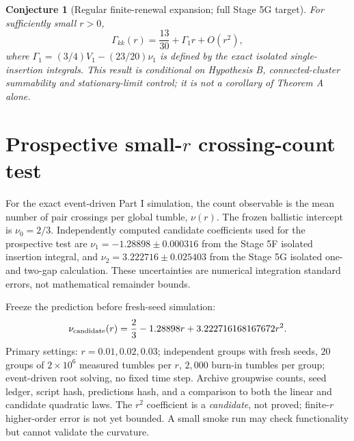 \documentclass[11pt]{article}
\newtheorem{conjecture}[theorem]{Conjecture}
\theoremstyle{remark}\newtheorem{remark}[theorem]{Remark}
\begin{document}
\begin{conjecture}[Regular finite-renewal expansion; full Stage 5G target]
For sufficiently small $r>0$,
\[\Gamma_{kk}(r)=\frac{13}{30}+\Gamma_1r+O(r^2),\]
where $\Gamma_1=(3/4)V_1-(23/20)\nu_1$ is defined by the exact isolated single-insertion integrals. This result is \emph{conditional on} Hypothesis B, connected-cluster summability and stationary-limit control; it is not a corollary of Theorem A alone.
\end{conjecture}

\section{Prospective small-$r$ crossing-count test}
For the exact event-driven Part I simulation, the count observable is the mean number of pair crossings per global tumble,
$\nu(r)$. The frozen ballistic intercept is $\nu_0=2/3$. Independently computed candidate coefficients used for the prospective test are $\nu_1=-1.28898\pm0.000316$ from the Stage 5F isolated insertion integral, and $\nu_2=3.222716\pm0.025403$ from the Stage 5G isolated one- and two-gap calculation. These uncertainties are numerical integration standard errors, not mathematical remainder bounds.

Freeze the prediction before fresh-seed simulation:
\begin{equation}\label{eq:nupred}
\nu_{\rm candidate}(r)=\frac23-1.28898r+3.222716168167672r^2.
\end{equation}
Primary settings: $r=0.01,0.02,0.03$; independent groups with fresh seeds, $20$ groups of $2\times10^6$ measured tumbles per $r$, $2,000$ burn-in tumbles per group; event-driven root solving, no fixed time step. Archive groupwise counts, seed ledger, script hash, predictions hash, and a comparison to both the linear and candidate quadratic laws. The $r^2$ coefficient is a \emph{candidate}, not proved; finite-$r$ higher-order error is not yet bounded. A small smoke run may check functionality but cannot validate the curvature.
\end{document}
